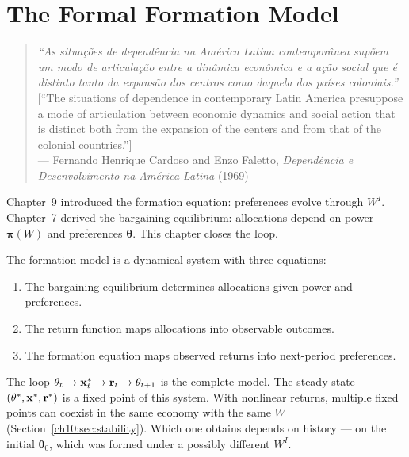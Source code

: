 \documentclass[../structural_economics_book.tex]{subfiles}
\begin{document}
\ifSubfilesClassLoaded{\setcounter{chapter}{9}}{}
\chapter{The Formal Formation Model}\label{ch:10}
\begin{quote}
\textit{``As situa\c{c}\~{o}es de depend\^{e}ncia na Am\'{e}rica Latina contempor\^{a}nea sup\~{o}em um modo de articula\c{c}\~{a}o entre a din\^{a}mica econ\^{o}mica e a a\c{c}\~{a}o social que \'{e} distinto tanto da expans\~{a}o dos centros como daquela dos pa\'{i}ses coloniais.''}\\[0.3em]
\textnormal{[``The situations of dependence in contemporary Latin America presuppose a mode of articulation between economic dynamics and social action that is distinct both from the expansion of the centers and from that of the colonial countries.'']}\\
\hfill --- Fernando Henrique Cardoso and Enzo Faletto, \textit{Depend\^{e}ncia e Desenvolvimento na Am\'{e}rica Latina} (1969)
\end{quote}
\nocite{cardoso1969dependencia,cardoso1970dependencia}

\vspace{1em}

Chapter~9 introduced the formation equation: preferences evolve through $W^I$. Chapter~7 derived the bargaining equilibrium: allocations depend on power $\boldsymbol{\pi}(W)$ and preferences $\boldsymbol{\theta}$. This chapter closes the loop.

The formation model is a dynamical system with three equations:
\begin{enumerate}
\item The bargaining equilibrium determines allocations given power and preferences.
\item The return function maps allocations into observable outcomes.
\item The formation equation maps observed returns into next-period preferences.
\end{enumerate}

The loop $\theta_t \to \mathbf{x}^*_t \to \mathbf{r}_t \to \theta_{t+1}$ is the complete model. The steady state $(\theta^*, \mathbf{x}^*, \mathbf{r}^*)$ is a fixed point of this system. With nonlinear returns, multiple fixed points can coexist in the same economy with the same $W$ (Section~\ref{ch10:sec:stability}). Which one obtains depends on history --- on the initial $\boldsymbol{\theta}_0$, which was formed under a possibly different $W^I$.
\end{document}
